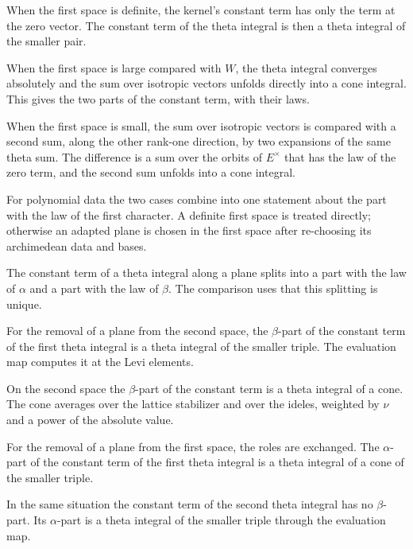 When the first space is definite, the kernel's constant term has only the term
at the zero vector. The constant term of the theta integral is then a theta
integral of the smaller pair.

When the first space is large compared with $W$, the theta integral converges
absolutely and the sum over isotropic vectors unfolds directly into a cone
integral. This gives the two parts of the constant term, with their laws.

When the first space is small, the sum over isotropic vectors is compared with
a second sum, along the other rank-one direction, by two expansions of the same
theta sum. The difference is a sum over the orbits of $E^\times$ that has the
law of the zero term, and the second sum unfolds into a cone integral.

For polynomial data the two cases combine into one statement about the part
with the law of the first character. A definite first space is treated
directly; otherwise an adapted plane is chosen in the first space after
re-choosing its archimedean data and bases.

The constant term of a theta integral along a plane splits into a part with
the law of $\alpha$ and a part with the law of $\beta$. The comparison uses
that this splitting is unique.

For the removal of a plane from the second space, the $\beta$-part of the
constant term of the first theta integral is a theta integral of the smaller
triple. The evaluation map computes it at the Levi elements.

On the second space the $\beta$-part of the constant term is a theta integral
of a cone. The cone averages over the lattice stabilizer and over the ideles,
weighted by $\nu$ and a power of the absolute value.

For the removal of a plane from the first space, the roles are exchanged. The
$\alpha$-part of the constant term of the first theta integral is a theta
integral of a cone of the smaller triple.

In the same situation the constant term of the second theta integral has no
$\beta$-part. Its $\alpha$-part is a theta integral of the smaller triple
through the evaluation map.

